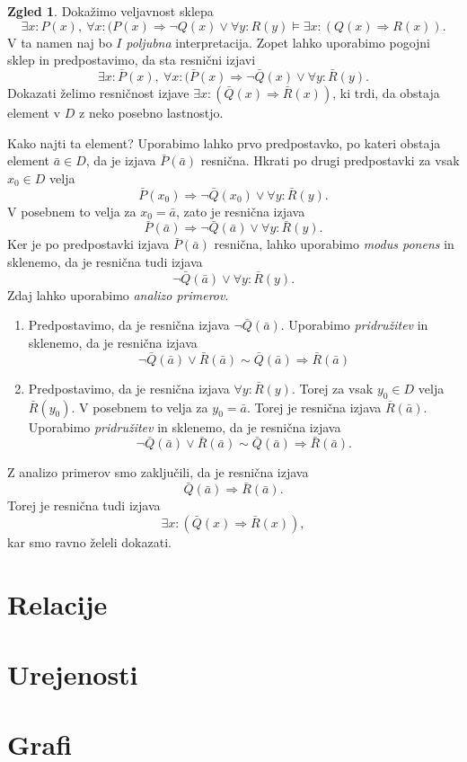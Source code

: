 \documentclass[11pt]{book}
\theoremstyle{definition}
\theoremstyle{zgled}
\newtheorem*{zgled}{Zgled}
\theoremstyle{odprtproblem}
\theoremstyle{domacanaloga}
\theoremstyle{izrek}
\begin{document}
\begin{zgled}
Dokažimo veljavnost sklepa
\[
    \exists x \colon P(x), \
    \forall x \colon (P(x) \Rightarrow \lnot Q(x) \lor \forall y \colon R(y) \models
    \exists x \colon (Q(x) \Rightarrow R(x)).
\]
V ta namen naj bo $I$ \emph{poljubna} interpretacija. Zopet lahko uporabimo pogojni sklep in predpostavimo, da sta resnični izjavi
\[
    \exists x \colon \bar P(x), \
    \forall x \colon (\bar P(x) \Rightarrow \lnot \bar Q(x) \lor \forall y \colon \bar R(y).
\]
Dokazati želimo resničnost izjave $\exists x \colon (\bar Q(x) \Rightarrow \bar R(x))$, ki trdi, da obstaja element v $D$ z neko posebno lastnostjo. 

Kako najti ta element? Uporabimo lahko prvo predpostavko, po kateri obstaja element $\bar a \in D$, da je izjava $\bar P(\bar a)$ resnična. Hkrati po drugi predpostavki za vsak $x_0 \in D$ velja
\[
    \bar P(x_0) \Rightarrow \lnot \bar Q(x_0) \lor \forall y \colon \bar R(y).  
\]
V posebnem to velja za $x_0 = \bar a$, zato je resnična izjava
\[
    \bar P(\bar a) \Rightarrow \lnot \bar Q(\bar a) \lor \forall y \colon \bar R(y).  
\]
Ker je po predpostavki izjava $\bar P(\bar a)$ resnična, lahko uporabimo \emph{modus ponens} in sklenemo, da je resnična tudi izjava
\[
    \lnot \bar Q(\bar a) \lor \forall y \colon \bar R(y).   
\]
Zdaj lahko uporabimo \emph{analizo primerov}.
\begin{enumerate}
    \item Predpostavimo, da je resnična izjava $\lnot \bar Q(\bar a)$. Uporabimo \emph{pridružitev} in sklenemo, da je resnična izjava
    \[
        \lnot \bar Q(\bar a) \lor \bar R(\bar a) \sim \bar Q(\bar a) \Rightarrow \bar R(\bar a)
    \]
    \item Predpostavimo, da je resnična izjava $\forall y \colon \bar R(y)$. Torej za vsak $y_0 \in D$ velja $\bar R(y_0)$. V posebnem to velja za $y_0 = \bar a$. Torej je resnična izjava $\bar R(\bar a)$. Uporabimo \emph{pridružitev} in sklenemo, da je resnična izjava 
    \[
        \lnot \bar Q(\bar a) \lor \bar R(\bar a) \sim \bar Q(\bar a) \Rightarrow \bar R(\bar a).
    \]
\end{enumerate}
Z analizo primerov smo zaključili, da je resnična izjava
\[
    \bar Q(\bar a) \Rightarrow \bar R(\bar a).
\]
Torej je resnična tudi izjava
\[
    \exists x \colon ( \bar Q(x) \Rightarrow \bar R(x) ),
\]
kar smo ravno želeli dokazati.
\end{zgled}

\chapter{Relacije}
\chapter{Urejenosti}
\chapter{Grafi}
\end{document}
